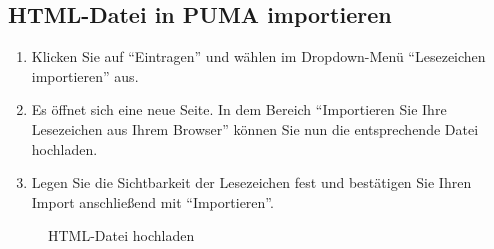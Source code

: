 \subsection{HTML-Datei in PUMA importieren}
\label{subsec:htmlDateiImportieren}
\begin{enumerate}
    \item Klicken Sie auf \enquote{Eintragen} und wählen im Dropdown-Menü \enquote{Lesezeichen importieren} aus.
    \item Es öffnet sich eine neue Seite. In dem Bereich \enquote{Importieren Sie Ihre Lesezeichen aus Ihrem Browser} können Sie nun die entsprechende Datei hochladen. 
    \item Legen Sie die Sichtbarkeit der Lesezeichen fest und bestätigen Sie Ihren Import anschließend mit \enquote{Importieren}.
\end{enumerate}
\begin{figure}[h!]
 \centering
 \caption{HTML-Datei hochladen}
 \label{fig:htmlDateiHochladen}
\end{figure}
